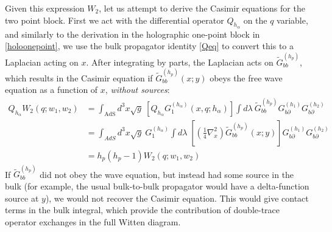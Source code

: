 \documentclass[12pt]{article}
\def\p{\partial}
\begin{document}
Given this expression $W_2$, let us attempt to derive the Casimir equations for the two point block. First we act with the differential operator $Q_{h_\alpha}$ on the $q$ variable, and similarly to the derivation in the holographic one-point block in \cref{holoonepoint}, we use the bulk propagator identity \cref{Qeq} to convert this to a Laplacian acting on $x$. After integrating by parts, the Laplacian acts on $\tilde{G}^{(h_p)}_{bb}$, which results in the Casimir equation if $\tilde{G}^{(h_p)}_{bb}(x;y)$ obeys the free wave equation as a function of $x$, \emph{without sources}:
\begin{align}
	Q_{h_\alpha}W_2(q;w_1,w_2) &=
\int_\text{AdS} \! d^3x \sqrt{g}  \:
\left[Q_{h_\alpha}  G^{(h_\alpha)}_1(x,q;h_\alpha) \right]
\int d\lambda\: \tilde{G}^{(h_p)}_{bb} G^{(h_1)}_{b\p} G^{(h_2)}_{b\p}  \nonumber\\
&=
\int_{AdS} \! d^3x \sqrt{g}  ~
G^{(h_\alpha)}_1
\int d\lambda\;
\left[\left(\frac{1}{4}\nabla_x^2\right) \tilde{G}^{(h_p)}_{bb}(x;y)\right]
G^{(h_1)}_{b\p}
G^{(h_2)}_{b\p}
\nonumber\\
&=h_p(h_p-1) W_2(q;w_1,w_2)
\end{align}
	If $\tilde{G}^{(h_p)}_{bb}$ did not obey the wave equation, but instead had some source in the bulk (for example, the usual bulk-to-bulk propagator would have a delta-function source at $y$), we would not recover the Casimir equation. This would give contact terms in the bulk integral, which provide the contribution of double-trace operator exchanges in the full Witten diagram.
\end{document}
